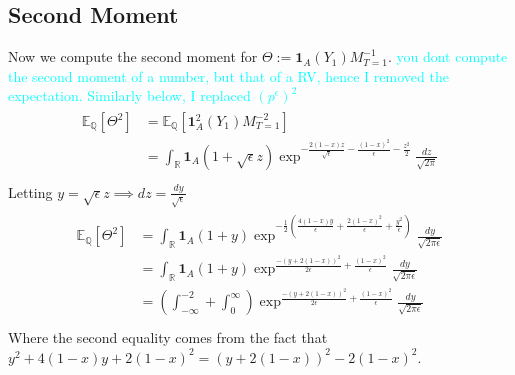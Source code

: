 \documentclass[11pt]{amsart}
\newcommand{\want}{p^{\epsilon}}
\newcommand{\noise}{\sqrt{\epsilon}}
\newcommand{\E}{\mathbb{E}}
\newcommand{\ind}{\mathbf{1}}
\newcommand{\R}{\mathbb{R}}
\newcommand{\ydnote}[1]{{\textcolor{cyan}{#1}}}
\begin{document}
\subsection{Second Moment}
Now we compute the second moment for
$\Theta :=\ind_{A}(Y_1) M_{T=1}^{-1}$.
\ydnote{you dont compute the second moment of a number, but that of
  a RV, hence I removed the expectation. Similarly below, I replaced
  $(\want)^2$}
\begin{align}
  \begin{split}
    \E_{\mathbb{Q}}[\Theta^2]
    &= \E_{\mathbb{Q}}[\ind_{A}^2(Y_1) M_{T=1}^{-2}] \\
    &= \int_{\R} \ind_{A}(1+\noise z)
    \exp^{-\frac{2(1-x)z}{\noise}-\frac{(1-x)^2}{\epsilon}-\frac{z^2}{2}}
    \frac{dz}{\sqrt{2\pi}} \\
  \end{split}
\end{align}
Letting $y = \noise z \implies dz = \frac{dy}{\noise}$
\begin{align}
  \begin{split}
    \E_{\mathbb{Q}}[\Theta^2]
    &= \int_{\R} \ind_{A}(1+y)
    \exp^{-\frac{1}{2}(\frac{4(1-x)y}{\epsilon}+\frac{2(1-x)^2}{\epsilon}+\frac{y^2}{\epsilon})}
    \frac{dy}{\sqrt{2\pi\epsilon}} \\
    &= \int_{\R} \ind_{A}(1+y)
    \exp^{\frac{-(y+2(1-x))^2}{2\epsilon}+\frac{(1-x)^2}{\epsilon}}
    \frac{dy}{\sqrt{2\pi\epsilon}}\\
    &= (\int_{-\infty}^{-2}+\int_{0}^{\infty})
    \exp^{\frac{-(y+2(1-x))^2}{2\epsilon}+\frac{(1-x)^2}{\epsilon}}
    \frac{dy}{\sqrt{2\pi\epsilon}}\\
  \end{split}
\end{align}
Where the second equality comes from the fact that
$y^2+4(1-x)y+2(1-x)^2=(y+2(1-x))^2-2(1-x)^2$.
\end{document}
